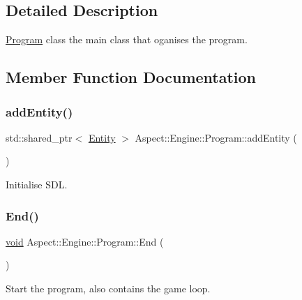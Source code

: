 \subsection{Detailed Description}
\mbox{\hyperlink{class_aspect_1_1_engine_1_1_program}{Program}} class the main class that oganises the program. 

\subsection{Member Function Documentation}
\mbox{\label{class_aspect_1_1_engine_1_1_program_a937df3d57a425f25be2f40c3dcaff072}} 
\subsubsection{\texorpdfstring{add\+Entity()}{addEntity()}}
{\footnotesize\ttfamily std\+::shared\+\_\+ptr$<$ \mbox{\hyperlink{class_aspect_1_1_engine_1_1_entity}{Entity}} $>$ Aspect\+::\+Engine\+::\+Program\+::add\+Entity (\begin{DoxyParamCaption}{ }\end{DoxyParamCaption})\hspace{0.3cm}{\ttfamily [static]}}



Initialise S\+DL. 

\mbox{\label{class_aspect_1_1_engine_1_1_program_aebf5093c9edb094862fc4fa0823d87e5}} 
\subsubsection{\texorpdfstring{End()}{End()}}
{\footnotesize\ttfamily \mbox{\hyperlink{_s_d_l__opengles2__gl2ext_8h_ae5d8fa23ad07c48bb609509eae494c95}{void}} Aspect\+::\+Engine\+::\+Program\+::\+End (\begin{DoxyParamCaption}{ }\end{DoxyParamCaption})}



Start the program, also contains the game loop. 

